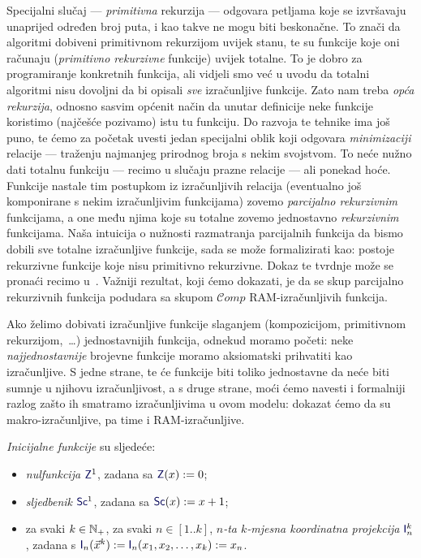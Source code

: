 Specijalni slučaj --- \emph{primitivna} rekurzija --- odgovara petljama koje se izvršavaju unaprijed određen broj puta, i kao takve ne mogu biti beskonačne. To znači da algoritmi dobiveni primitivnom rekurzijom uvijek stanu, te su funkcije koje oni računaju (\emph{primitivno rekurzivne} funkcije) uvijek totalne. To je dobro za programiranje konkretnih funkcija, ali vidjeli smo već u uvodu da totalni algoritmi nisu dovoljni da bi opisali \emph{sve} izračunljive funkcije. Zato nam treba \emph{opća rekurzija}, odnosno sasvim općenit način da unutar definicije neke funkcije koristimo (najčešće pozivamo) istu tu funkciju. Do razvoja te tehnike ima još puno, te ćemo za početak uvesti jedan specijalni oblik koji odgovara \emph{minimizaciji} relacije --- traženju najmanjeg prirodnog broja s nekim svojstvom. To neće nužno dati totalnu funkciju --- recimo u slučaju prazne relacije --- ali ponekad hoće. Funkcije nastale tim postupkom iz izračunljivih relacija (eventualno još komponirane s nekim izračunljivim funkcijama) zovemo \emph{parcijalno rekurzivnim} funkcijama, a one među njima koje su totalne zovemo jednostavno \emph{rekurzivnim} funkcijama. Naša intuicija o nužnosti razmatranja parcijalnih funkcija da bismo dobili sve totalne izračunljive funkcije, sada se može formalizirati kao: postoje rekurzivne funkcije koje nisu primitivno rekurzivne. Dokaz te tvrdnje može se pronaći recimo u~\cite[dodatak]{skr:Vuk}. Važniji rezultat, koji ćemo dokazati, je da se skup parcijalno rekurzivnih funkcija podudara sa skupom $\mathcal Comp$ RAM-izračunljivih funkcija. %


Ako želimo dobivati izračunljive funkcije slaganjem (kompozicijom, primitivnom rekurzijom,~\ldots) jednostavnijih funkcija, odnekud moramo početi: neke \emph{najjednostavnije} brojevne funkcije moramo aksiomatski prihvatiti kao izračunljive. S jedne strane, te će funkcije biti toliko jednostavne da neće biti sumnje u njihovu izračunljivost, a s druge strane, moći ćemo navesti i formalniji razlog zašto ih smatramo izračunljivima u ovom modelu: dokazat ćemo da su makro-izračunljive, pa time i RAM-izračunljive.

\begin{definicija}\label{def:init}
\emph{Inicijalne funkcije} su sljedeće:
\begin{itemize}
    \item \emph{nulfunkcija} $\f Z^1$, zadana sa $\f Z(x):=0$;
    \item \emph{sljedbenik} $\f{Sc}^1$, zadana sa $\f{Sc}(x):=x+1$;
    \item za svaki $k\in{\mathbb N}_+$, za svaki $n\in[1..k]$, \emph{$n$-ta $k$-mjesna koordinatna projekcija} $\f I_n^k$, zadana s $\f I_n(\vec x^k):=\f I_n(x_1,x_2,\dotsc,x_k):=x_n$.\qedhere
\end{itemize}
\end{definicija}

